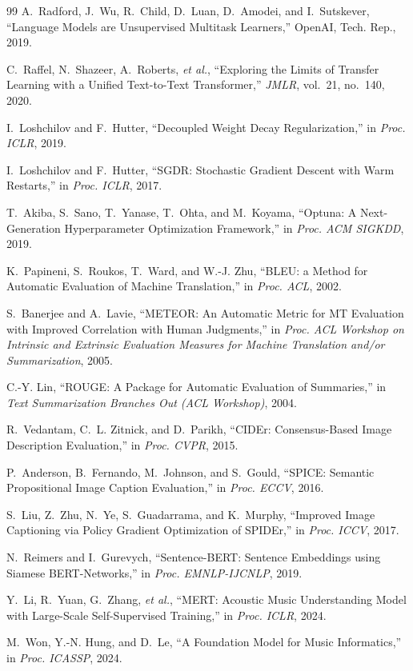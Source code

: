 \documentclass{article}
\begin{document}
{\begin{thebibliography}{99}
A.~Radford, J.~Wu, R.~Child, D.~Luan, D.~Amodei, and I.~Sutskever,
``Language Models are Unsupervised Multitask Learners,'' OpenAI, Tech. Rep., 2019.

C.~Raffel, N.~Shazeer, A.~Roberts, \emph{et al.},
``Exploring the Limits of Transfer Learning with a Unified Text-to-Text Transformer,''
\emph{JMLR}, vol.~21, no.~140, 2020.

I.~Loshchilov and F.~Hutter,
``Decoupled Weight Decay Regularization,'' in \emph{Proc. ICLR}, 2019.

I.~Loshchilov and F.~Hutter,
``SGDR: Stochastic Gradient Descent with Warm Restarts,'' in \emph{Proc. ICLR}, 2017.

T.~Akiba, S.~Sano, T.~Yanase, T.~Ohta, and M.~Koyama,
``Optuna: A Next-Generation Hyperparameter Optimization Framework,'' in \emph{Proc. ACM SIGKDD},
2019.

K.~Papineni, S.~Roukos, T.~Ward, and W.-J. Zhu,
``BLEU: a Method for Automatic Evaluation of Machine Translation,'' in \emph{Proc. ACL}, 2002.

S.~Banerjee and A.~Lavie,
``METEOR: An Automatic Metric for MT Evaluation with Improved Correlation with Human
Judgments,'' in \emph{Proc. ACL Workshop on Intrinsic and Extrinsic Evaluation Measures for
Machine Translation and/or Summarization}, 2005.

C.-Y. Lin,
``ROUGE: A Package for Automatic Evaluation of Summaries,'' in \emph{Text Summarization
Branches Out (ACL Workshop)}, 2004.

R.~Vedantam, C.~L. Zitnick, and D.~Parikh,
``CIDEr: Consensus-Based Image Description Evaluation,'' in \emph{Proc. CVPR}, 2015.

P.~Anderson, B.~Fernando, M.~Johnson, and S.~Gould,
``SPICE: Semantic Propositional Image Caption Evaluation,'' in \emph{Proc. ECCV}, 2016.

S.~Liu, Z.~Zhu, N.~Ye, S.~Guadarrama, and K.~Murphy,
``Improved Image Captioning via Policy Gradient Optimization of SPIDEr,'' in \emph{Proc. ICCV},
2017.

N.~Reimers and I.~Gurevych,
``Sentence-BERT: Sentence Embeddings using Siamese BERT-Networks,'' in \emph{Proc.
EMNLP-IJCNLP}, 2019.

Y.~Li, R.~Yuan, G.~Zhang, \emph{et al.},
``MERT: Acoustic Music Understanding Model with Large-Scale Self-Supervised Training,'' in
\emph{Proc. ICLR}, 2024.

M.~Won, Y.-N. Hung, and D.~Le,
``A Foundation Model for Music Informatics,'' in \emph{Proc. ICASSP}, 2024.

\end{thebibliography}
}
\end{document}
